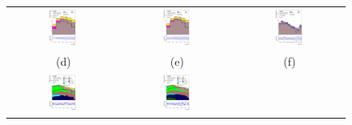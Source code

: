 \begin{figure}[H]
\begin{tabular}{@{}ccc@{}}
\includegraphics[page=1,width=0.28\textwidth]{figures/mtt/tuH_reg1l1tau1b2j_os_log_mtt.pdf}&
\includegraphics[page=1,width=0.28\textwidth]{figures/mtt/tuH_reg1l1tau1b3j_os_log_mtt.pdf}&
\includegraphics[page=1,width=0.28\textwidth]{figures/mtt/tuH_reg1l2tau1bnj_ss_log_mtt.pdf}\\
(d) & (e) & (f)\\
\includegraphics[page=1,width=0.28\textwidth]{figures/mtt/tuH_reg2mtau1b2jos_log_mtt.pdf}&
\includegraphics[page=1,width=0.28\textwidth]{figures/mtt/tuH_reg2mtau1b3jos_log_mtt.pdf}&

\end{tabular}
\end{figure}
